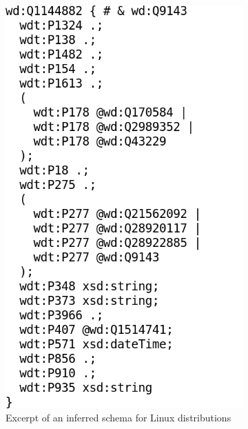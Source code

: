 \begin{figure}[t]
  \begin{subfigure}[t]{0.45\textwidth}
    \centering
    \includegraphics[trim={0 2.5cm 0 0},clip]{screenshots/shexc-no-syntax-highlighting}
    \caption{
      Excerpt of an inferred \gls{schema} for Linux distributions
    }
    \label{fig:shexc-syntax-highlighting-without}
  \end{subfigure}
  \begin{subfigure}[t]{0.45\textwidth}
    \centering

\end{subfigure}
\end{figure}
